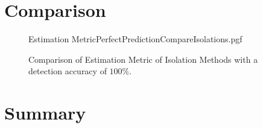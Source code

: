 %	

\section{Comparison}
\begin{figure}[!htb]
	\centering
	{Estimation MetricPerfectPredictionCompareIsolations.pgf}
	
	\caption{Comparison of Estimation Metric of Isolation Methods with a detection accuracy of $100\%$.}
	\label{fig:IsolationMethodsWithPerfectPrediction}
\end{figure}

\section{Summary}